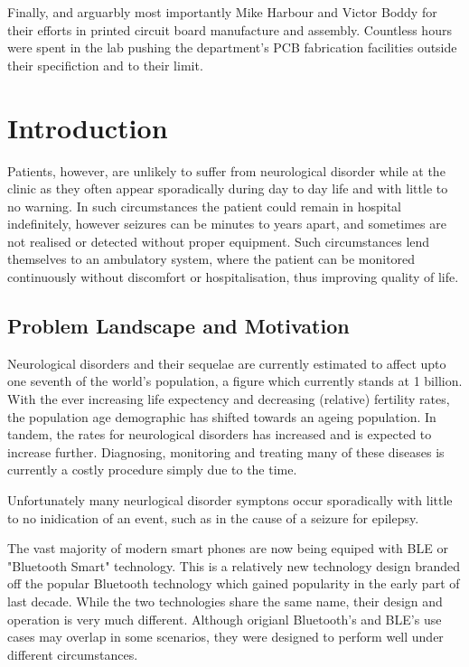 \documentclass[]{article}
\begin{document}
Finally, and arguarbly most importantly Mike Harbour and Victor Boddy for their efforts in printed circuit board manufacture and assembly. Countless hours were spent in the lab pushing the department's PCB fabrication facilities outside their specifiction and to their limit. 

\clearpage

\section{Introduction}
Patients, however, are unlikely to suffer from neurological disorder while at the clinic as they often appear sporadically during day to day life and with little to no warning. In such circumstances the patient could remain in hospital indefinitely, however seizures can be minutes to years apart, and sometimes are not realised or detected without proper equipment. Such circumstances lend themselves to an ambulatory system, where the patient can be monitored continuously without discomfort or hospitalisation, thus improving quality of life. 



\subsection{Problem Landscape and Motivation}
Neurological disorders and their sequelae are currently estimated to affect upto one seventh of the world's population, a figure which currently stands at 1 billion. With the ever increasing life expectency and decreasing (relative) fertility rates, the population age demographic has shifted towards an ageing population. In tandem, the rates for neurological disorders has increased and is expected to increase further. Diagnosing, monitoring and treating many of these diseases is currently a costly procedure simply due to the time. 

Unfortunately many neurlogical disorder symptons occur sporadically with little to no inidication of an event, such as in the cause of a seizure for epilepsy.



The vast majority of modern smart phones are now being equiped with \ac{BLE} or "Bluetooth Smart" technology. This is a relatively new technology design branded off the popular Bluetooth technology which gained popularity in the early part of last decade. While the two technologies share the same name, their design and operation is very much different. Although origianl Bluetooth's and \ac{BLE}'s use cases may overlap in some scenarios, they were designed to perform well under different circumstances.  
\end{document}
